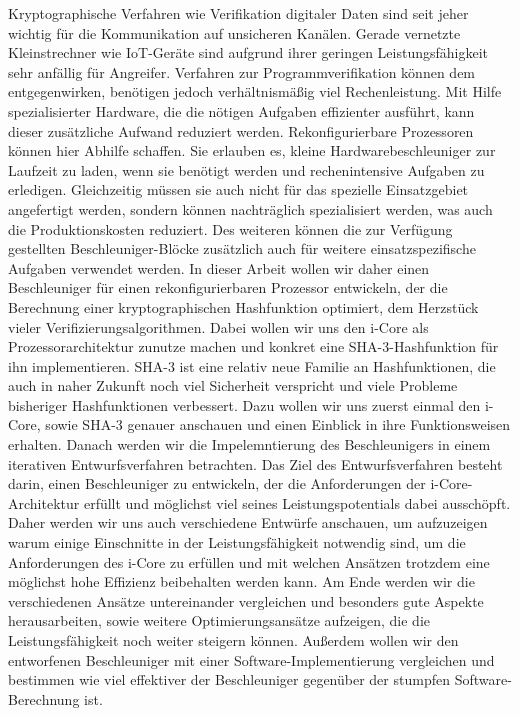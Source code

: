 Kryptographische Verfahren wie Verifikation digitaler Daten sind seit jeher wichtig für die Kommunikation auf unsicheren Kanälen.
Gerade vernetzte Kleinstrechner wie IoT-Geräte sind aufgrund ihrer geringen Leistungsfähigkeit sehr anfällig für Angreifer.
Verfahren zur Programmverifikation können dem entgegenwirken, benötigen jedoch verhältnismäßig viel Rechenleistung.
Mit Hilfe spezialisierter Hardware, die die nötigen Aufgaben effizienter ausführt, kann dieser zusätzliche Aufwand reduziert werden.
Rekonfigurierbare Prozessoren können hier Abhilfe schaffen. Sie erlauben es, kleine Hardwarebeschleuniger zur Laufzeit zu laden,
wenn sie benötigt werden und rechenintensive Aufgaben zu erledigen. Gleichzeitig müssen sie auch nicht für das spezielle
Einsatzgebiet angefertigt werden, sondern können nachträglich spezialisiert werden, was auch die Produktionskosten reduziert.
Des weiteren können die zur Verfügung gestellten Beschleuniger-Blöcke zusätzlich auch für weitere einsatzspezifische Aufgaben verwendet werden.
In dieser Arbeit wollen wir daher einen Beschleuniger für einen rekonfigurierbaren Prozessor entwickeln, der die Berechnung einer
kryptographischen Hashfunktion optimiert, dem Herzstück vieler Verifizierungsalgorithmen. Dabei wollen wir uns den i-Core als Prozessorarchitektur
zunutze machen und konkret eine SHA-3-Hashfunktion für ihn implementieren. SHA-3 ist eine relativ neue Familie an Hashfunktionen,
die auch in naher Zukunft noch viel Sicherheit verspricht und viele Probleme bisheriger Hashfunktionen verbessert.
Dazu wollen wir uns zuerst einmal den i-Core, sowie SHA-3 genauer anschauen und einen Einblick in ihre Funktionsweisen erhalten.
Danach werden wir die Impelemntierung des Beschleunigers in einem iterativen Entwurfsverfahren betrachten. Das Ziel des
Entwurfsverfahren besteht darin, einen Beschleuniger zu entwickeln, der die Anforderungen der i-Core-Architektur erfüllt
und möglichst viel seines Leistungspotentials dabei ausschöpft. Daher werden wir uns auch verschiedene Entwürfe anschauen,
um aufzuzeigen warum einige Einschnitte in der Leistungsfähigkeit notwendig sind, um die Anforderungen des i-Core zu erfüllen
und mit welchen Ansätzen trotzdem eine möglichst hohe Effizienz beibehalten werden kann. Am Ende werden wir die verschiedenen
Ansätze untereinander vergleichen und besonders gute Aspekte herausarbeiten, sowie weitere Optimierungsansätze aufzeigen,
die die Leistungsfähigkeit noch weiter steigern können. Außerdem wollen wir den entworfenen Beschleuniger mit einer
Software-Implementierung vergleichen und bestimmen wie viel effektiver der Beschleuniger gegenüber der stumpfen Software-Berechnung ist.